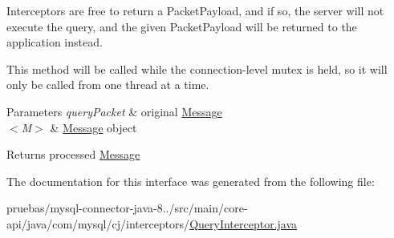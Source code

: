 Interceptors are free to return a Packet\+Payload, and if so, the server will not execute the query, and the given Packet\+Payload will be returned to the application instead.

This method will be called while the connection-\/level mutex is held, so it will only be called from one thread at a time.


\begin{DoxyParams}{Parameters}
{\em query\+Packet} & original \mbox{\hyperlink{}{Message}} \\
\hline
{\em $<$\+M$>$} & \mbox{\hyperlink{}{Message}} object \\
\hline
\end{DoxyParams}
\begin{DoxyReturn}{Returns}
processed \mbox{\hyperlink{}{Message}} 
\end{DoxyReturn}


The documentation for this interface was generated from the following file\+:\begin{DoxyCompactItemize}
\item 
pruebas/mysql-\/connector-\/java-\/8../src/main/core-\/api/java/com/mysql/cj/interceptors/\mbox{\hyperlink{_query_interceptor_8java}{Query\+Interceptor.\+java}}\end{DoxyCompactItemize}
